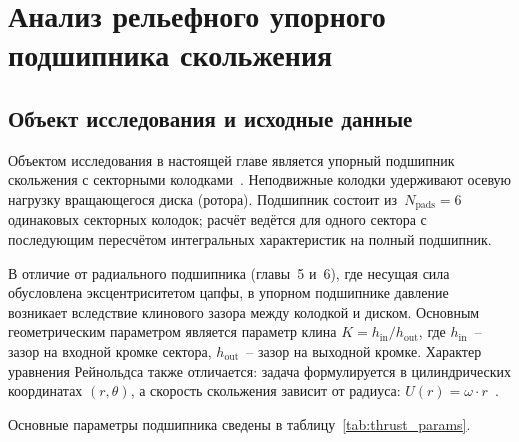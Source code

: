 \chapter{Анализ рельефного упорного подшипника скольжения}

\section{Объект исследования и исходные данные}

Объектом исследования в настоящей главе является упорный подшипник
скольжения с секторными колодками~\cite{gropper2018,wasilczuk2008}. Неподвижные колодки удерживают
осевую нагрузку вращающегося диска (ротора). Подшипник состоит
из~$N_{\mathrm{pads}} = 6$ одинаковых секторных колодок; расчёт
ведётся для одного сектора с последующим пересчётом интегральных
характеристик на полный подшипник.

В отличие от радиального подшипника (главы~5 и~6), где несущая сила
обусловлена эксцентриситетом цапфы, в упорном подшипнике давление
возникает вследствие клинового зазора между колодкой и диском.
Основным геометрическим параметром является параметр клина
$K = h_{\mathrm{in}} / h_{\mathrm{out}}$, где
$h_{\mathrm{in}}$~-- зазор на входной кромке сектора,
$h_{\mathrm{out}}$~-- зазор на выходной кромке.
Характер уравнения Рейнольдса также отличается: задача формулируется
в цилиндрических координатах $(r, \theta)$, а скорость скольжения
зависит от радиуса: $U(r) = \omega \cdot r$~\cite{brajdic2005,heinrichson2008}.

Основные параметры подшипника сведены в
таблицу~\ref{tab:thrust_params}.

